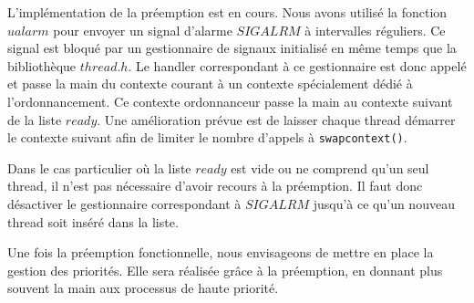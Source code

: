 L'implémentation de la préemption est en cours. Nous avons utilisé la fonction
$ualarm$ pour envoyer un signal d'alarme $SIGALRM$ à intervalles réguliers. Ce
signal est bloqué par un gestionnaire de signaux initialisé en même temps que
la bibliothèque $thread.h$. Le handler correspondant à ce gestionnaire est
donc appelé et passe la main du contexte courant à un contexte spécialement
dédié à l'ordonnancement. Ce contexte ordonnanceur passe la main au contexte
suivant de la liste $ready$. Une amélioration prévue est de laisser chaque
thread démarrer le contexte suivant afin de limiter le nombre d'appels à
\verb!swapcontext()!.

Dans le cas particulier où la liste $ready$ est vide ou ne comprend qu'un seul
thread, il n'est pas nécessaire d'avoir recours à la préemption. Il faut donc
désactiver le gestionnaire correspondant à $SIGALRM$ jusqu'à ce qu'un nouveau
thread soit inséré dans la liste.

Une fois la préemption fonctionnelle, nous envisageons de mettre en place la
gestion des priorités. Elle sera réalisée grâce à la préemption, en donnant
plus souvent la main aux processus de haute priorité.
